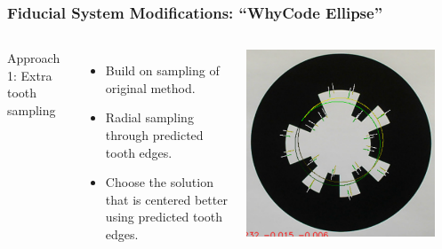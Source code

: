 \documentclass[aspectratio=169]{rubeamer}
\begin{document}
\begin{frame}
  \frametitle{Fiducial System Modifications: ``WhyCode Ellipse''}

  \begin{columns}
    Approach 1: Extra tooth sampling
    \begin{itemize}
      \item Build on sampling of original method.
      \item Radial sampling through predicted tooth edges.
      \item Choose the solution that is centered better using predicted tooth edges.
    \end{itemize}
    \centering
    \includegraphics[width=0.9\textwidth]{whycode_ellipse_both_solutions_cropped}\\
  \end{columns}
\end{frame}
\end{document}
